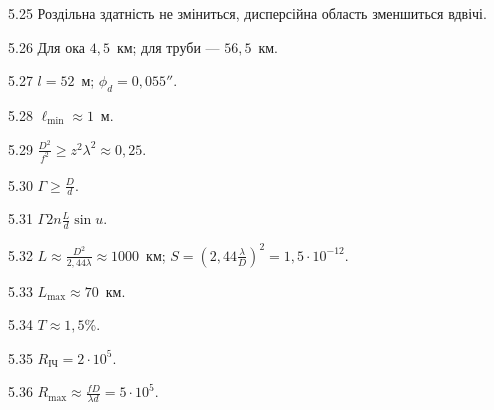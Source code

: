 \begin{Solution}{5.{25}}
        Роздільна здатність не зміниться, дисперсійна область зменшиться вдвічі.
    
\end{Solution}
\begin{Solution}{5.{26}}
        Для ока $4,5$~км; для труби --- $56,5$~км.
    
\end{Solution}
\begin{Solution}{5.{27}}
        $l = 52$~м; $\phi_d = 0,055''$.
    
\end{Solution}
\begin{Solution}{5.{28}}
        $\ell_{\min}\approx 1$~м.
    
\end{Solution}
\begin{Solution}{5.{29}}
        $\frac{D^2}{f^2} \ge z^2\lambda^2 \approx 0,25$.
    
\end{Solution}
\begin{Solution}{5.{30}}
        $\Gamma \ge \frac{D}{d}$.
    
\end{Solution}
\begin{Solution}{5.{31}}
        $\Gamma 2n  \frac{L}{d}\sin u$.
    
\end{Solution}
\begin{Solution}{5.{32}}
        $L \approx \frac{D^2}{2,44 \lambda} \approx 1000$~км; $ S = \left( 2,44\frac{\lambda}{D} \right)^2 = 1,5\cdot10^{-12}$.
    
\end{Solution}
\begin{Solution}{5.{33}}
        $L_{\max} \approx 70$~км.
    
\end{Solution}
\begin{Solution}{5.{34}}
        $T \approx 1,5$\%.
    
\end{Solution}
\begin{Solution}{5.{35}}
        $R_\text{ІЧ} = 2\cdot10^5$.
    
\end{Solution}
\begin{Solution}{5.{36}}
        $R_{\max} \approx \frac{fD}{\lambda d} = 5\cdot10^5$.
    
\end{Solution}
